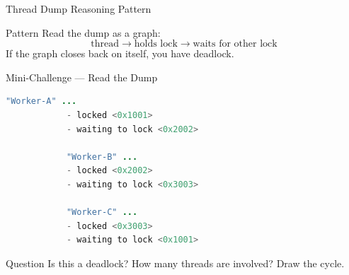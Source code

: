 \documentclass[aspectratio=169,11pt]{beamer}
\begin{document}
	\begin{frame}{Thread Dump Reasoning Pattern}
		\centering
		
		\vspace{0.4cm}
		
		\begin{block}{Pattern}
			Read the dump as a graph:
			\[
			\text{thread} \rightarrow \text{holds lock} \rightarrow \text{waits for other lock}
			\]
			If the graph closes back on itself, you have deadlock.
		\end{block}
	\end{frame}
	
	\begin{frame}[fragile]{Mini-Challenge --- Read the Dump}
		\begin{lstlisting}[language=Java]
			"Worker-A" ...
			- locked <0x1001>
			- waiting to lock <0x2002>
			
			"Worker-B" ...
			- locked <0x2002>
			- waiting to lock <0x3003>
			
			"Worker-C" ...
			- locked <0x3003>
			- waiting to lock <0x1001>
		\end{lstlisting}
		
		\vspace{0.3cm}
		
		\begin{alertblock}{Question}
			Is this a deadlock? How many threads are involved?  
			Draw the cycle.
		\end{alertblock}
	\end{frame}
	
\end{document}
